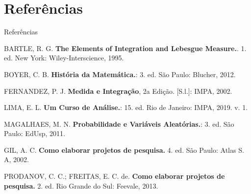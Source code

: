 	\section*{Referências}
	\begin{frame}{Referências}
	
	{\footnotesize
	
	BARTLE, R. G. \textbf{The Elements of Integration and Lebesgue Measure.}. 1. ed. New York:
	Wiley-Interscience, 1995.
	
	\vspace{0.5cm}
	
	BOYER, C. B. \textbf{História da Matemática.}: 3. ed. São Paulo: Blucher, 2012.	
		
	\vspace{0.5cm}
	
	FERNANDEZ, P. J. \textbf{Medida e Integração}, 2a Edição. [S.l.]: IMPA, 2002.
	
	\vspace{0.5cm}
	
	LIMA, E. L. \textbf{Um Curso de Análise.}: 15. ed. Rio de Janeiro: IMPA, 2019. v. 1.

	\vspace{0.5cm}
	
	MAGALHAES, M. N. \textbf{Probabilidade e Variáveis Aleatórias.}: 3. ed. São Paulo: EdUsp, 2011.
	
	\vspace{0.5cm}
	
	GIL, A. C. \textbf{Como elaborar projetos de pesquisa.} 4. ed. São Paulo: Atlas S. A, 2002.
	
	\vspace{0.5cm}
	
	PRODANOV, C. C.; FREITAS, E. C. de. \textbf{Como elaborar projetos de pesquisa.} 2. ed. Rio
	Grande do Sul: Feevale, 2013.
}
	\end{frame}